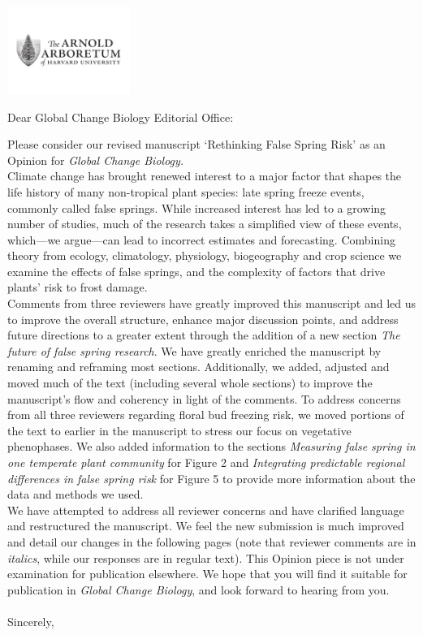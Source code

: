 \documentclass[11pt,a4paper]{letter}\usepackage[]{graphicx}\usepackage[]{color}
\begin{document}
\begin{letter}{}
\includegraphics[width=0.3\textwidth]{AA_logo.jpg}

\opening{Dear Global Change Biology Editorial Office:}

\noindent Please consider our revised manuscript `Rethinking False Spring Risk' as an Opinion for \emph{Global Change Biology.} 
\vspace{1.5ex}\\
Climate change has brought renewed interest to a major factor that shapes the life history of many non-tropical plant species: late spring freeze events, commonly called false springs. While increased interest has led to a growing number of studies, much of the research takes a simplified view of these events, which---we argue---can lead to incorrect estimates and forecasting. Combining theory from ecology, climatology, physiology, biogeography and crop science we examine the effects of false springs, and the complexity of factors that drive plants' risk to frost damage.
\vspace{1.5ex}\\
Comments from three reviewers have greatly improved this manuscript and led us to improve the overall structure, enhance major discussion points, and address future directions to a greater extent through the addition of a new section \textit{The future of false spring research}. We have greatly enriched the manuscript by renaming and reframing most sections. Additionally, we added, adjusted and moved much of the text (including several whole sections) to improve the manuscript's flow and coherency in light of the comments. To address concerns from all three reviewers regarding floral bud freezing risk, we moved portions of the text to earlier in the manuscript to stress our focus on vegetative phenophases. We also added information to the sections \emph{Measuring false spring in one temperate plant community} for Figure 2 and \emph{Integrating predictable regional differences in false spring risk} for Figure 5 to provide more information about the data and methods we used.
\vspace{1.5ex}\\
We have attempted to address all reviewer concerns and have clarified language and restructured the manuscript. We feel the new submission is much improved and detail our changes in the following pages (note that reviewer comments are in \emph{italics}, while our responses are in regular text). This Opinion piece is not under examination for publication elsewhere. We hope that you will find it suitable for publication in \emph{Global Change Biology}, and look forward to hearing from you.
\\\vspace{-1ex}\\
\noindent Sincerely,\\


\end{letter}
\end{document}
